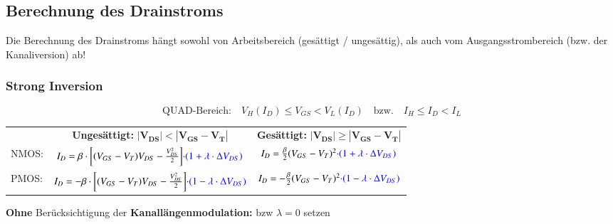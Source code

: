 \subsection{Berechnung des Drainstroms}

Die Berechnung des Drainstroms hängt sowohl von Arbeitsbereich (gesättigt / ungesättig), als auch vom Ausgangsstrombereich (bzw. der Kanaliversion) ab!


\subsubsection{Strong Inversion}

\vspace{-0.3cm}

$$ \boxed{ \text{QUAD-Bereich:} \quad V_H(I_D) \leq V_{GS} < V_L(I_D) \quad \text{bzw.} \quad I_H \leq I_D < I_L } $$  %

\resizebox{\columnwidth}{!}
{
    \renewcommand{\arraystretch}{1.5}
    \begin{tabular}{@{}l c | c@{}}
                & \textbf{Ungesättigt:} \quad $\bm{| V_{DS} | < | V_{GS} - V_T |}$                                                              & \textbf{Gesättigt:} \quad $\bm{| V_{DS} | \geq | V_{GS} - V_T |}$                         \\
        NMOS:   & $I_D = \beta \cdot \bigg[ (V_{GS} - V_T) V_{DS} - \frac{V_{DS}^2}{2} \bigg] {\color{blue}\cdot (1 + \lambda \cdot \Delta V_{DS})}$    & $I_D = \frac{\beta}{2} (V_{GS} - V_T)^2 {\color{blue}\cdot (1 + \lambda \cdot \Delta V_{DS})}$    \\
        \midrule
        PMOS:   & $I_D = - \beta \cdot \bigg[ (V_{GS} - V_T) V_{DS} - \frac{V_{DS}^2}{2} \bigg] {\color{blue}\cdot (1 - \lambda \cdot \Delta V_{DS})}$  & $I_{D} = - \frac{\beta}{2} (V_{GS} - V_T)^2 {\color{blue}\cdot (1 - \lambda \cdot \Delta V_{DS})}$
    \end{tabular}
    \renewcommand{\arraystretch}{1}
}

\medskip

\textbf{Ohne} Berücksichtigung der \textbf{Kanallängenmodulation:}  bzw $\lambda = 0$ setzen




